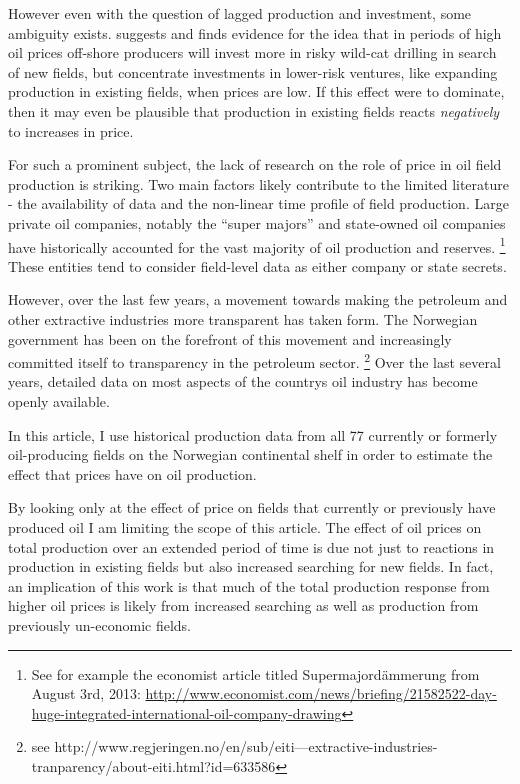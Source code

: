\documentclass[11pt]{article}
\begin{document}
However even with the question of lagged production and investment, some ambiguity exists.  \citet{mohn_efforts_2008} suggests and finds evidence for the idea that in periods of high oil prices off-shore producers will invest more in risky wild-cat drilling in search of new fields, but concentrate investments in lower-risk ventures, like expanding production in existing fields, when prices are low.  If this effect were to dominate, then it may even be plausible that production in existing fields reacts \emph{negatively} to increases in price. 


For such a prominent subject, the lack of research on the role of price in oil field production is striking. Two main factors likely contribute to the limited literature - the availability of data and the non-linear time profile of field production.  Large private oil companies, notably the “super majors” and state-owned oil companies have historically accounted for the vast majority of oil production and reserves. \footnote{See for example the economist article titled Supermajordämmerung from August 3rd, 2013: \url{http://www.economist.com/news/briefing/21582522-day-huge-integrated-international-oil-company-drawing}} These entities tend to consider field-level data as either company or state secrets.   

However, over the last few years, a movement towards making the petroleum and other extractive industries more transparent has taken form.  The Norwegian government has been on the forefront of this movement and increasingly committed itself to transparency in the petroleum sector. \footnote{see http://www.regjeringen.no/en/sub/eiti---extractive-industries-tranparency/about-eiti.html?id=633586} Over the last several years, detailed data on most aspects of the country\’s oil industry has become openly available.  

In this article, I use historical production data from all 77 currently or formerly oil-producing fields on the Norwegian continental shelf in order to estimate the effect that prices have on oil production.  

By looking only at the effect of price on fields that currently or previously have produced oil I am limiting the scope of this article.  The effect of oil prices on total production over an extended period of time is due not just to reactions in production in existing fields but also increased searching for new fields.  In fact, an implication of this work is that much of the total production response from higher oil prices is likely from increased searching as well as production from previously un-economic fields.
\end{document}
